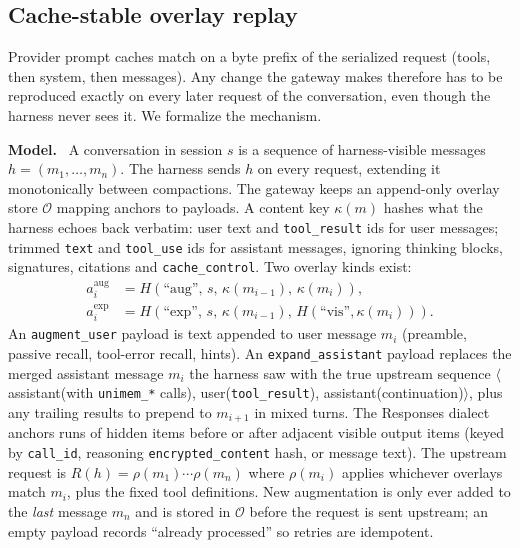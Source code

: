 \documentclass[10pt,twocolumn]{article}
\newcommand{\code}[1]{\texttt{\small #1}}
\newcommand{\para}[1]{\smallskip\noindent\textbf{#1}\ }
\begin{document}
\subsection{Cache-stable overlay replay}
\label{sec:overlay}

Provider prompt caches match on a byte prefix of the serialized request (tools, then system, then messages). Any
change the gateway makes therefore has to be reproduced exactly on every later request of the conversation, even
though the harness never sees it. We formalize the mechanism.

\para{Model.} A conversation in session $s$ is a sequence of harness-visible messages $h=(m_1,\dots,m_n)$. The harness
sends $h$ on every request, extending it monotonically between compactions. The gateway keeps an append-only
overlay store $\mathcal{O}$ mapping anchors to payloads. A content key $\kappa(m)$ hashes what the harness echoes back
verbatim: user text and \code{tool\_result} ids for user messages; trimmed \code{text} and \code{tool\_use} ids for
assistant messages, ignoring thinking blocks, signatures, citations and \code{cache\_control}. Two overlay kinds
exist:
\begin{align*}
a^{\text{aug}}_i &= H(\text{``aug''},\, s,\, \kappa(m_{i-1}),\, \kappa(m_i)),\\
a^{\text{exp}}_i &= H(\text{``exp''},\, s,\, \kappa(m_{i-1}),\, H(\text{``vis''}, \kappa(m_i))).
\end{align*}
An \code{augment\_user} payload is text appended to user message $m_i$ (preamble, passive recall, tool-error recall,
hints). An \code{expand\_assistant} payload replaces the merged assistant message $m_i$ the harness saw with the true
upstream sequence $\langle$assistant(with \code{unimem\_*} calls), user(\code{tool\_result}), assistant(continuation)$\rangle$,
plus any trailing results to prepend to $m_{i+1}$ in mixed turns. The Responses dialect anchors runs of hidden items
before or after adjacent visible output items (keyed by \code{call\_id}, reasoning \code{encrypted\_content} hash, or
message text). The upstream request is $R(h)=\rho(m_1)\cdots\rho(m_n)$ where $\rho(m_i)$ applies whichever overlays
match $m_i$, plus the fixed tool definitions. New augmentation is only ever added to the \emph{last} message $m_n$ and is
stored in $\mathcal{O}$ before the request is sent upstream; an empty payload records ``already processed'' so retries
are idempotent.
\end{document}
